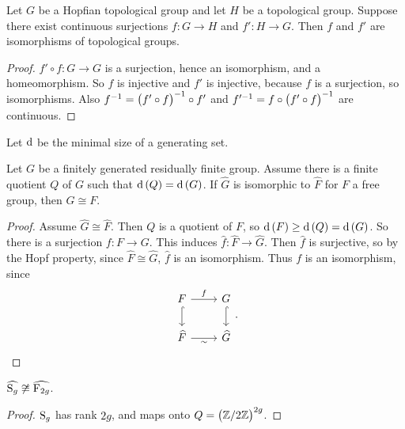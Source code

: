 \begin{proposition}
Let $ G $ be a Hopfian topological group and let $ H $ be a topological group. Suppose there exist continuous surjections $ f : G \to H $ and $ f' : H \to G $. Then $ f $ and $ f' $ are isomorphisms of topological groups.
\end{proposition}

\begin{proof}
$ f' \circ f : G \to G $ is a surjection, hence an isomorphism, and a homeomorphism. So $ f $ is injective and $ f' $ is injective, because $ f $ is a surjection, so isomorphisms. Also $ f^{-1} = \br{f' \circ f}^{-1} \circ f' $ and $ f'^{-1} = f \circ \br{f' \circ f}^{-1} $ are continuous.
\end{proof}

\pagebreak

Let $ \d $ be the minimal size of a generating set.

\begin{proposition}
Let $ G $ be a finitely generated residually finite group. Assume there is a finite quotient $ Q $ of $ G $ such that $ \d\br{Q} = \d\br{G} $. If $ \widehat{G} $ is isomorphic to $ \widehat{F} $ for $ F $ a free group, then $ G \cong F $.
\end{proposition}

\begin{proof}
Assume $ \widehat{G} \cong \widehat{F} $. Then $ Q $ is a quotient of $ F $, so $ \d\br{F} \ge \d\br{Q} = \d\br{G} $. So there is a surjection $ f : F \to G $. This induces $ \widehat{f} : \widehat{F} \to \widehat{G} $. Then $ \widehat{f} $ is surjective, so by the Hopf property, since $ \widehat{F} \cong \widehat{G} $, $ \widehat{f} $ is an isomorphism. Thus $ f $ is an isomorphism, since
$$
\begin{tikzcd}
F \arrow{r}{f} \arrow[hookrightarrow]{d} & G \arrow[hookrightarrow]{d} \\
\widehat{F} \arrow{r}[swap]{\sim} & \widehat{G}
\end{tikzcd}.
$$
\end{proof}

\begin{corollary}
$ \widehat{\S_g} \not\cong \widehat{\F_{2g}} $.
\end{corollary}

\begin{proof}
$ \S_g $ has rank $ 2g $, and maps onto $ Q = \br{\ZZ / 2\ZZ}^{2g} $.
\end{proof}

